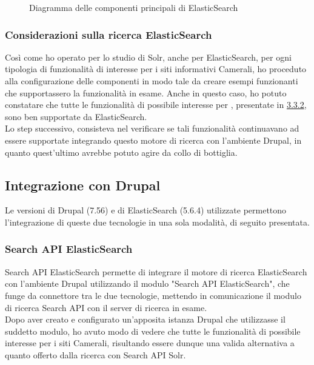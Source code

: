 			\begin{figure}[p]
				\caption{Diagramma delle componenti principali di ElasticSearch}
			\end{figure}
			
			\subsubsection{Considerazioni sulla ricerca ElasticSearch}
			Così come ho operato per lo studio di \gls{Solr}, anche per \gls{ElasticSearch}, per ogni tipologia di funzionalità di interesse per i siti informativi Camerali, ho proceduto alla configurazione delle componenti in modo tale da creare esempi funzionanti che supportassero la funzionalità in esame. Anche in questo caso, ho potuto constatare che tutte le funzionalità di possibile interesse per \nomeAzienda, presentate in \hyperref[sub:possibile_evoluzione]{3.3.2}, sono ben supportate da \gls{ElasticSearch}. \\
			Lo step successivo, consisteva nel verificare se tali funzionalità continuavano ad essere supportate integrando questo motore di ricerca con l'ambiente \gls{Drupal}, in quanto quest'ultimo avrebbe potuto agire da collo di bottiglia.
		
		\subsection{Integrazione con Drupal}
		Le versioni di \gls{Drupal} (7.56) e di \gls{ElasticSearch} (5.6.4) utilizzate permettono l'integrazione di queste due tecnologie in una sola modalità, di seguito presentata.
		
			\subsubsection{Search API ElasticSearch}
			Search API ElasticSearch permette di integrare il motore di ricerca \gls{ElasticSearch} con l'ambiente \gls{Drupal} utilizzando il modulo "Search API ElasticSearch", che funge da connettore tra le due tecnologie, mettendo in comunicazione il modulo di ricerca \gls{Search API} con il server di ricerca in esame. \\
			Dopo aver creato e configurato un'apposita istanza \gls{Drupal} che utilizzasse il suddetto modulo, ho avuto modo di vedere che tutte le funzionalità di possibile interesse per i siti Camerali, risultando essere dunque una valida alternativa a quanto offerto dalla ricerca con Search API Solr.

